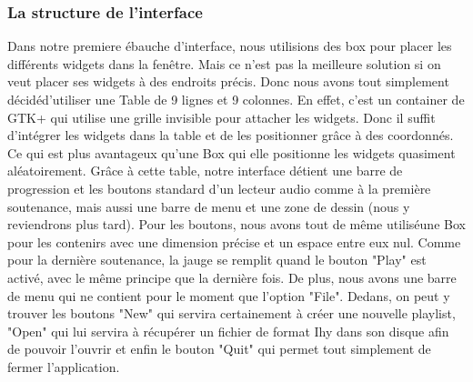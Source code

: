 \documentclass[a4paper,12pt]{article}
\begin{document}
	\subsubsection{La structure de l'interface}
Dans notre premiere \'ebauche d'interface, nous utilisions des box pour placer les
diff\'erents widgets dans la fen\^etre. Mais ce n'est pas la meilleure solution si 
on veut placer ses widgets à des endroits pr\'ecis. Donc nous avons tout simplement 
d\'ecid\'ed'utiliser une Table de 9 lignes et 9 colonnes. En effet, c'est un container 
de GTK+ qui utilise une grille invisible pour attacher les widgets. Donc il suffit 
d'int\'egrer les widgets dans la table et de les positionner grâce à des coordonn\'es.
Ce qui est plus avantageux qu'une Box qui elle positionne les widgets quasiment 
al\'eatoirement. Grâce à cette table, notre interface d\'etient une barre de progression 
et les boutons standard d'un lecteur audio comme à la premi\`ere soutenance, mais aussi 
une barre de menu et une zone de dessin (nous y reviendrons plus tard). Pour les boutons, 
nous avons tout de m\^eme utilis\'eune Box pour les contenirs  avec une dimension pr\'ecise et un 
espace entre eux nul. Comme pour la derni\`ere soutenance, la jauge se remplit quand
le bouton "Play" est activ\'e, avec le m\^eme principe que la derni\`ere fois. De plus, nous avons une 
barre de menu qui ne contient pour le moment que l'option "File". Dedans, on peut y trouver les boutons
"New" qui servira certainement à cr\'eer une nouvelle playlist, "Open" qui lui servira à 
r\'ecup\'erer un fichier de format Ihy dans son disque afin de pouvoir l'ouvrir et enfin 
le bouton "Quit" qui permet tout simplement de fermer l'application.
\end{document}
